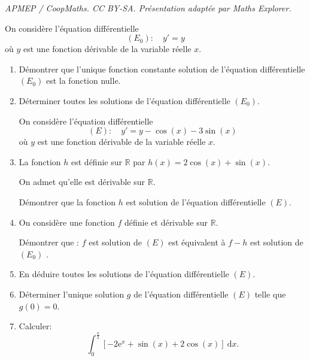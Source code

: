 \documentclass[10pt]{article}
\providecommand{\R}{\mathbb{R}}
\providecommand{\e}{{\mathrm{e}}}
\begin{document}
\noindent\textit{APMEP / CoopMaths. CC BY-SA. Présentation adaptée par Maths Explorer.}\par\medskip
\medskip

On considère l'équation différentielle 
\[\left(E_0\right) :\quad  y' = y\]
où $y$ est une fonction dérivable de la variable réelle $x$.

\medskip

\begin{enumerate}
\item Démontrer que l'unique fonction constante solution de l'équation différentielle 
$\left(E_0\right)$ est la fonction nulle.
\item Déterminer toutes les solutions de l'équation différentielle $\left(E_0\right)$.

On considère l'équation différentielle 
\[(E) :\quad  y' = y - \cos (x) - 3\sin (x)\]
où $y$ est une fonction dérivable de la variable réelle $x$.

\item La fonction $h$ est définie sur $\R$ par $h(x) = 2 \cos (x) + \sin (x)$.

On admet qu'elle est dérivable sur $\R$.

Démontrer que la fonction $h$ est solution de l'équation différentielle $(E)$.
\item On considère une fonction $f$ définie et dérivable sur $\R$.

Démontrer que : \og $f$ est solution de $(E)$ \fg{} est équivalent à \og $f - h$ est solution de $\left(E_0\right)$ \fg.
\item En déduire toutes les solutions de l'équation différentielle $(E)$.
\item Déterminer l'unique solution $g$ de l'équation différentielle $(E)$ telle que $g(0) = 0$.
\item Calculer:
\[\displaystyle\int_0^{\frac{\pi}{2}} \left[-2\e^x + \sin (x) + 2\cos (x)\right]\:\text{d}x.\]
\end{enumerate}

\medskip
\end{document}
